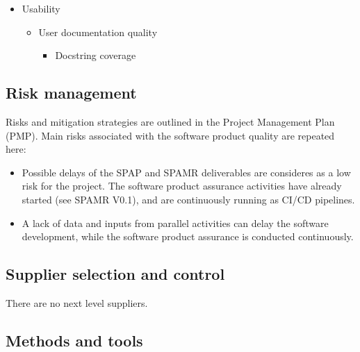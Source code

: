 \begin{itemize}
\begin{itemize}
\begin{itemize}
            \item Number of lines of code per method/function
            \item Cyclomatic Complexity
            \item Maintainability Index
        \end{itemize}
    \end{itemize}
    \item Usability
    \begin{itemize}
        \item User documentation quality
        \begin{itemize}
            \item Docstring coverage
        \end{itemize}
    \end{itemize}
\end{itemize}

\subsection{Risk management}


Risks and mitigation strategies are outlined in the Project Management Plan (PMP). Main risks associated with the software product quality are repeated here:
\begin{itemize}
    \item Possible delays of the SPAP and SPAMR deliverables are consideres as a low risk for the project. The software product assurance activities have already started (see SPAMR V0.1), and are continuously running as CI/CD pipelines.
    \item A lack of data and inputs from parallel activities can delay the software development, while the software product assurance is conducted continuously.
\end{itemize}

\subsection{Supplier selection and control}
There are no next level suppliers.

\subsection{Methods and tools}
\label{subsec:methods-and-tools}


